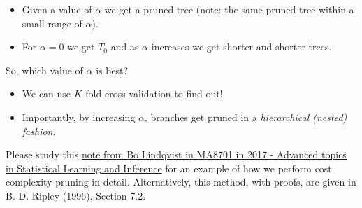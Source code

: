 \documentclass[10pt,ignorenonframetext,]{beamer}
\begin{document}
\begin{frame}

\begin{itemize}
\item
  Given a value of \(\alpha\) we get a pruned tree (note: the same
  pruned tree within a small range of \(\alpha\)).
\item
  For \(\alpha=0\) we get \(T_0\) and as \(\alpha\) increases we get
  shorter and shorter trees.
\end{itemize}

So, which value of \(\alpha\) is best?

\begin{itemize}
\item
  We can use \(K\)-fold cross-validation to find out!
\item
  Importantly, by increasing \(\alpha\), branches get pruned in a
  \emph{hierarchical (nested) fashion}.
\end{itemize}

Please study this
\href{https://www.math.ntnu.no/emner/TMA4268/2018v/notes/CART1MA87012017BoLindqvist.pdf}{note
from Bo Lindqvist in MA8701 in 2017 - Advanced topics in Statistical
Learning and Inference} for an example of how we perform cost complexity
pruning in detail. Alternatively, this method, with proofs, are given in
B. D. Ripley (1996), Section 7.2.

\end{frame}
\end{document}
